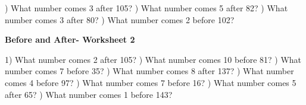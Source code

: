 \documentclass{article}%
\begin{document}
) What number comes 3 after 105?%
\newline%
\newline%
) What number comes 5 after 82?%
\newline%
\newline%
) What number comes 3 after 80?%
\newline%
\newline%
) What number comes 2 before 102?%
\newline%
\newline%
\newline%
\pagebreak%
\large%
\begin{center}%
\textbf{Before and After- Worksheet 2}%
\newline%
\newline%
\newline%
\end{center} \normalsize%
1) What number comes 2 after 105?%
\newline%
\newline%
) What number comes 10 before 81?%
\newline%
\newline%
) What number comes 7 before 35?%
\newline%
\newline%
) What number comes 8 after 137?%
\newline%
\newline%
) What number comes 4 before 97?%
\newline%
\newline%
) What number comes 7 before 16?%
\newline%
\newline%
) What number comes 5 after 65?%
\newline%
\newline%
) What number comes 1 before 143?%
\newline%
\newline%
\newline%
\end{document}
